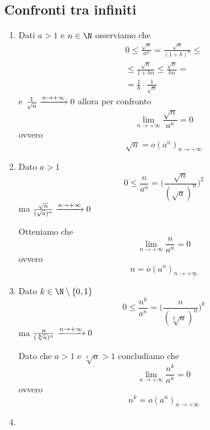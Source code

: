 \subsection{Confronti tra infiniti}
\begin{enumerate}
    \item Dati $ a>1 $ e $ n \in \N $ osserviamo che 
    \begin{multline*}
        0\le \frac{\sqrt{n}}{a^n}=\frac{\sqrt{n}}{(1+h)^n}\le\\
        \le \frac{\sqrt{n}}{1+hn}\le \frac{\sqrt{n}}{hn}=\\
        =\frac{1}{h}\cdot\frac{1}{\sqrt{n}}
    \end{multline*}
    e $ \frac{1}{\sqrt{n}} \xrightarrow{n\to + \infty} 0 \displaystyle $ allora per confronto \[
        \lim_{n\to +\infty} \frac{\sqrt{n}}{a^n} =0
    \]
    ovvero \[
        \sqrt{n}=o(a^n)_{n\to +\infty}
    \]
    \item Dato $ a>1 $
    \[
        0\le \frac{n}{a^n}=\bigg(\frac{\sqrt{n}}{(\sqrt{a})^n}\bigg)^2
    \]
    ma $ \frac{\sqrt{n}}{(\sqrt{a})^n} \xrightarrow{n\to + \infty} 0 \displaystyle $

    Otteniamo che \[
        \lim_{n\to + \infty} \frac{n}{a^n} =0
    \]
    ovvero \[
        n=o(a^n)_{n\to + \infty}
    \]
    \item Dato $ k \in \N\setminus \{0,1\} $
    \[
        0\le \frac{n^k}{a^n}=\bigg(\frac{n}{(\sqrt[k]{a})^n}\bigg)^k
    \]
    ma $ \frac{n}{(\sqrt[k]{a})^n} \xrightarrow{n\to + \infty} 0 \displaystyle $

    Dato che $ a>1 $ e $ \sqrt[k]{a}>1 $ concludiamo che \[
        \lim_{n\to + \infty} \frac{n^k}{a^n} = 0 
    \]
    ovvero \[
        n^k = o(a^n)_{n\to + \infty}
    \]
    \item %
\end{enumerate}